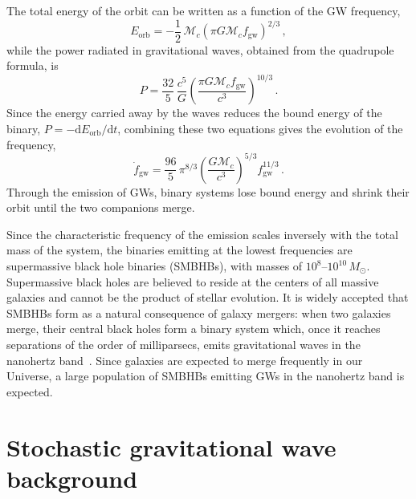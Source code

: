 The total energy of the orbit can be written as a function
of the GW frequency,
\begin{equation}
    E_{\mathrm{orb}} = -\frac{1}{2}\,\mathcal{M}_c
    \left(\pi G \mathcal{M}_c f_{\mathrm{gw}}\right)^{2/3}\, ,
    \label{eq:E_orb}
\end{equation}
while the power radiated in gravitational waves, obtained from the quadrupole
formula, is
\begin{equation}
    P = \frac{32}{5}\,\frac{c^5}{G}
    \left(\frac{\pi G \mathcal{M}_c f_{\mathrm{gw}}}{c^3}\right)^{10/3}\, .
    \label{eq:potenza}
\end{equation}
Since the energy carried away by the waves reduces the bound energy of the
binary,
$P = -\mathrm{d}E_{\mathrm{orb}}/\mathrm{d}t$, combining these two equations
gives the evolution of the frequency,
\begin{equation}
    \dot f_{\mathrm{gw}} = \frac{96}{5}\,\pi^{8/3}
    \left(\frac{G\mathcal{M}_c}{c^3}\right)^{5/3} f_{\mathrm{gw}}^{11/3}\, .
    \label{eq:chirp}
\end{equation}
Through the emission of GWs, binary systems lose bound energy and shrink their
orbit until the two companions merge.

Since the characteristic frequency of the emission scales inversely with the
total mass of the system, the binaries emitting at the lowest frequencies are
supermassive black hole binaries (SMBHBs), with masses of
$10^{8}$--$10^{10}\,M_\odot$. Supermassive black holes are believed to
reside at the centers of all massive galaxies and cannot be
the product of stellar evolution. It is widely accepted that SMBHBs form as a
natural consequence of galaxy mergers: when two galaxies merge, their central
black holes form a binary system which, once it reaches separations of the
order of milliparsecs, emits gravitational waves in the nanohertz band~\cite{Taylor2021,Sesana2008}.
Since galaxies are expected to merge frequently in our Universe, a large
population of SMBHBs emitting GWs in the nanohertz band is expected.


\section{Stochastic gravitational wave background} \label{sec:GWB}

